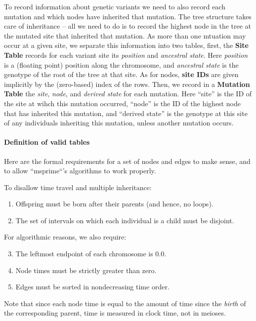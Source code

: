 \documentclass{article}
\newcommand{\plr}[1]{{\em \color{blue} #1}}
\begin{document}
To record information about genetic variants we need to also record each mutation
and which nodes have inherited that mutation.
The tree structure takes care of inheritance -- all we need to do
is to record the highest node in the tree at the mutated site
that inherited that mutation.
As more than one mtuation may occur at a given site,
we separate this information into two tables,
first, the \textbf{Site Table} records for each variant site its \emph{position} and \emph{ancestral state}.
Here \emph{position} is a (floating point) position along the chromosome,
and \emph{ancestral state} is the genotype of the root of the tree at that site.
As for nodes, \textbf{site IDs} are given implicitly
by the (zero-based) index of the rows.
Then, we record in a \textbf{Mutation Table} the \emph{site}, \emph{node}, and \emph{derived state}
for each mutation.
Here ``site'' is the ID of the site at wihch this mutation occurred,
``node'' is the ID of the highest node that has inherited this mutation,
and ``derived state'' is the genotype at this site of any individuals inheriting this mutation,
unless another mutation occurs.

\paragraph{Definition of valid tables}
Here are the formal requirements for a set of nodes and edges to make sense,
and to allow ``msprime``'s algorithms to work properly.

To disallow time travel and multiple inheritance:
\begin{enumerate}
    \item Offspring must be born after their parents (and hence, no loops).
    \item The set of intervals on which each individual is a child must be disjoint.
\end{enumerate}
For algorithmic reasons, we also require:
\begin{enumerate} \setcounter{enumi}{2}
    \item The leftmost endpoint of each chromosome is 0.0.
    \item Node times must be strictly greater than zero.
    \item Edges must be sorted in nondecreasing time order.
\end{enumerate}
Note that since each node time is equal to the amount of time since the \emph{birth} of the
corresponding parent, time is measured in clock time, not in meioses.
\end{document}
